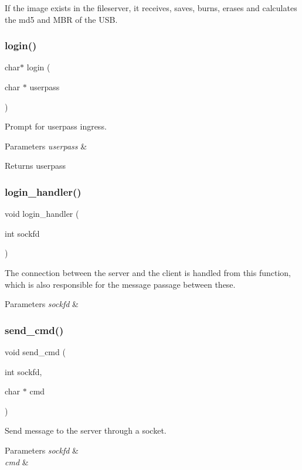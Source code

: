 If the image exists in the fileserver, it receives, saves, burns, erases and calculates the md5 and M\+BR of the U\+SB. 

\mbox{\label{client_8h_a184b4ae1814dc2cdcea053bafd7f097f}} 
\subsubsection{login()}
{\footnotesize\ttfamily char$\ast$ login (\begin{DoxyParamCaption}\item[{char $\ast$}]{userpass }\end{DoxyParamCaption})}



Prompt for userpass ingress. 


\begin{DoxyParams}{Parameters}
{\em userpass} & \\
\hline
\end{DoxyParams}
\begin{DoxyReturn}{Returns}
userpass 
\end{DoxyReturn}
\mbox{\label{client_8h_a98d7f4c6baab897a754ea7a006c5cb11}} 
\subsubsection{login\+\_\+handler()}
{\footnotesize\ttfamily void login\+\_\+handler (\begin{DoxyParamCaption}\item[{int}]{sockfd }\end{DoxyParamCaption})}



The connection between the server and the client is handled from this function, which is also responsible for the message passage between these. 


\begin{DoxyParams}{Parameters}
{\em sockfd} & \\
\hline
\end{DoxyParams}
\mbox{\label{client_8h_a3f2e03899acbcffa63c626522bfb6c40}} 
\subsubsection{send\+\_\+cmd()}
{\footnotesize\ttfamily void send\+\_\+cmd (\begin{DoxyParamCaption}\item[{int}]{sockfd,  }\item[{char $\ast$}]{cmd }\end{DoxyParamCaption})}



Send message to the server through a socket. 


\begin{DoxyParams}{Parameters}
{\em sockfd} & \\
\hline
{\em cmd} & \\
\hline
\end{DoxyParams}
